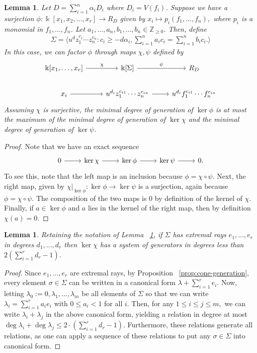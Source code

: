 \documentclass{amsart}
\theoremstyle{plain}
\newtheorem{lem}[thm]{Lemma}
\theoremstyle{definition}
\theoremstyle{remark}
\numberwithin{equation}{section}
\newcommand\bz{{\mathbb Z}}
\newcommand\bk{{\Bbbk}}
\newcommand\bida{a}
\newcommand\bidb{b}
\begin{document}
\begin{lem}
\label{lem:composite-map}
Let $D = \sum_{i=1}^{n}\alpha_i D_i$ where $D_i = V(f_i)$. Suppose we have a surjection $\phi: \bk[x_1,x_2,\ldots, x_r] \rightarrow R_D$ given by $x_i \mapsto p_i(f_1, \ldots, f_n),$ where $p_i$ is a monomial in $f_1,\ldots, f_n$. Let $\bida_1, \ldots, \bida_n, \bidb_1, \ldots, \bidb_n \in \bz_{\geq 0}.$ Then, define
\begin{align*}
	\Sigma = \langle u^d z_1^{c_1} \cdots z_n^{c_n} : c_i \geq -d \alpha_i, \sum_{i=1}^{n} \bida_i c_i = \sum_{i=1}^{n} \bidb_i c_i. \rangle 
\end{align*}
In this case, we can factor $\phi$ through maps $\chi, \psi$ defined by
\[
\begin{tikzcd}
\bk[x_1,\ldots, x_r] \ar {r}{\chi} & \bk[\Sigma] \ar {r}{\psi} & R_D \\
x_i \ar r & u^{d_i}z_1^{c_{i1}} \cdots z_n^{c_{in}} \ar r & u^{d_i}f_1^{c_{i1}} \cdots f_n^{c_{in}}
\end{tikzcd}
\]
Assuming $\chi$ is surjective, the minimal degree of generation of $\ker \phi$ is at most the maximum of the minimal degree of generation of $\ker \chi$ and the minimal degree of generation of $\ker \psi$.
\end{lem}
\begin{proof}
Note that we have an exact sequence
\[
\begin{tikzcd}
0 \ar r & \ker \chi \ar r & \ker \phi \ar r & \ker \psi \ar r & 0.
\end{tikzcd}
\]
To see this, note that the left map is an inclusion because $\phi = \chi \circ \psi$. Next, the right map, given by $\chi|_{\ker \phi}:\ker \phi \rightarrow \ker \psi$ is a surjection, again because $\phi = \chi \circ \psi$. The composition of the two maps is $0$ by definition of the kernel of $\chi$. Finally, if $a \in \ker \phi$ and $a$ lies in the kernel of the right map, then by definition $\chi(a) = 0$.
\end{proof}

\begin{lem}
\label{lem:bound-ker-chi}
Retaining the notation of Lemma ~\ref{lem:composite-map}, if $\Sigma$ has extremal rays $e_1,\ldots, e_r$ in degrees $d_1, \ldots, d_r$ then $\ker \chi$ has a system of generators in degrees less than $2(\sum_{i=1}^{r}d_r-1)$.
\end{lem}
\begin{proof}
Since $e_1, \ldots, e_r$ are extremal rays, by Proposition ~\ref{prop:cone-generation}, every element $\sigma \in \Sigma$ can be written in a canonical form $\lambda + \sum_{i=1}^{r}e_i$. Now, letting $\lambda_0 := 0,\lambda_1, \ldots, \lambda_m$ be all elements of $\Sigma$ so that we can write $\lambda_i = \sum_{i=1}^{r}\bida_i e_i$ with $0 \leq \bida_i < 1$ for all $i$. Then, for any $1 \leq i \leq j \leq m,$ we can write $\lambda_i + \lambda_j$ in the above canonical form, yielding a relation in degree at most $\deg \lambda_i + \deg \lambda_j \leq 2 \cdot \left( \sum_{i=1}^{r}d_r -1 \right).$ Furthermore, these relations generate all relations, as one can apply a sequence of these relations to put any $\sigma \in \Sigma$ into canonical form.
\end{proof}
\end{document}
